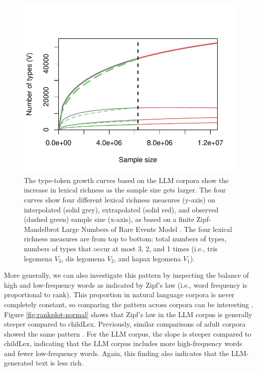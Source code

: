\documentclass[doc, a4paper]{apa7}
\begin{document}
\begin{figure}[!htbp]
  \centering
    \includegraphics[scale=1]{figures/df.growth.intrextr-3.5.pdf}
    \caption{The type-token growth curves based on the LLM corpora show the increase in lexical richness as the sample size gets larger. The four curves show four different lexical richness measures (y-axis) on interpolated (solid grey), extrapolated (solid red), and observed (dashed green) sample size (x-axis), as based on a finite Zipf-Mandelbrot Large Numbers of Rare Events Model \citep[LNRE model, see][]{evert_simple_2004}. The four lexical richness measures are from top to bottom: total numbers of types, numbers of types that occur at most 3, 2, and 1 times (i.e., tris legomena $V_3$, dis legomena $V_2$, and hapax legomena $V_1$).}
    \label{fig:df.growth.intrextr}
  \hfill
\end{figure}


More generally, we can also investigate this pattern by inspecting the balance of high and low-frequency words as indicated by Zipf's law (i.e., word frequency is proportional to rank). This proportion in natural language corpora is never completely constant, so comparing the pattern across corpora can be interesting \citep[see, e.g., ][]{baayen_analyzing_2008, piantadosi_zipfs_2014, baayen_word_2001}. Figure \ref{fig:rankplot-normal} shows that Zipf's law in the LLM corpus is generally steeper compared to childLex. Previously, similar comparisons of adult corpora showed the same pattern \citep[i.e., SubtLEX and Google Book corpus, ][]{brysbaert_impact_2016}. For the LLM corpus, the slope is steeper compared to childLex, indicating that the LLM corpus includes more high-frequency words and fewer low-frequency words. Again, this finding also indicates that the LLM-generated text is less rich.  
\end{document}
